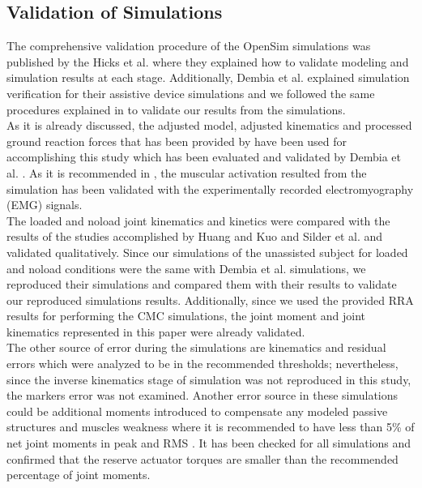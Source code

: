 \documentclass[10pt,letterpaper]{article}
\begin{document}
\subsection*{Validation of Simulations}
The comprehensive validation procedure of the OpenSim simulations was published by the Hicks et al. \cite{92} where they explained how to validate modeling and simulation results at each stage. Additionally, Dembia et al. \cite{93} explained simulation verification for their assistive device simulations and we followed the same procedures explained in \cite{92,93} to validate our results from the simulations.\\
As it is already discussed, the adjusted model, adjusted kinematics and processed ground reaction forces that has been provided by \cite{93} have been used for accomplishing this study which has been evaluated and validated by Dembia et al. \cite{93}. As it is recommended in \cite{92}, the muscular activation resulted from the simulation has been validated with the experimentally recorded electromyography (EMG) signals.\\
The loaded and noload joint kinematics and kinetics were compared with the results of the studies accomplished by Huang and Kuo \cite{131} and Silder et al.\cite{132} and validated qualitatively. Since our simulations of the unassisted subject for loaded and noload conditions were the same with Dembia et al. simulations, we reproduced their simulations and compared them with their results to validate our reproduced simulations results. Additionally, since we used the provided RRA results for performing the CMC simulations, the joint moment and joint kinematics represented in this paper were already validated.\\
The other source of error during the simulations are kinematics and residual errors which were analyzed to be in the recommended thresholds\cite{92}; nevertheless, since the inverse kinematics stage of simulation was not reproduced in this study, the markers error was not examined. Another error source in these simulations could be additional moments introduced to compensate any modeled passive structures and muscles weakness where it is recommended to have less than 5\% of net joint moments in peak and RMS \cite{92}. It has been checked for all simulations and confirmed that the reserve actuator torques are smaller than the recommended percentage of joint moments.
\end{document}
